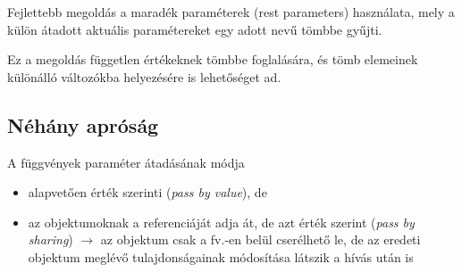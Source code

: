 \begin{frame}
  Fejlettebb megoldás a maradék paraméterek (rest parameters) használata, mely a külön átadott aktuális paramétereket egy adott nevű tömbbe gyűjti.
  \begin{exampleblock}{}
    
  \end{exampleblock}
\end{frame}

\begin{frame}
  Ez a megoldás független értékeknek tömbbe foglalására, és tömb elemeinek különálló változókba helyezésére is lehetőséget ad.
  \begin{exampleblock}{}
    
  \end{exampleblock}
\end{frame}

\subsection{Néhány apróság}

\begin{frame}
  A függvények paraméter átadásának módja
  \begin{itemize}
      \item alapvetően érték szerinti (\emph{pass by value}), de
      \item az objektumoknak a referenciáját adja át, de azt érték szerint (\emph{pass by sharing}) $\to$ az objektum csak a fv.-en belül cserélhető le, de az eredeti objektum meglévő tulajdonságainak módosítása látszik a hívás után is
  \end{itemize}
\end{frame}

\begin{frame}
  \footnotesize
  \begin{exampleblock}{}
      \footnotesize
      \vspace{-0.3cm}
      
      \vspace{-0.3cm}
  \end{exampleblock}
\end{frame}

